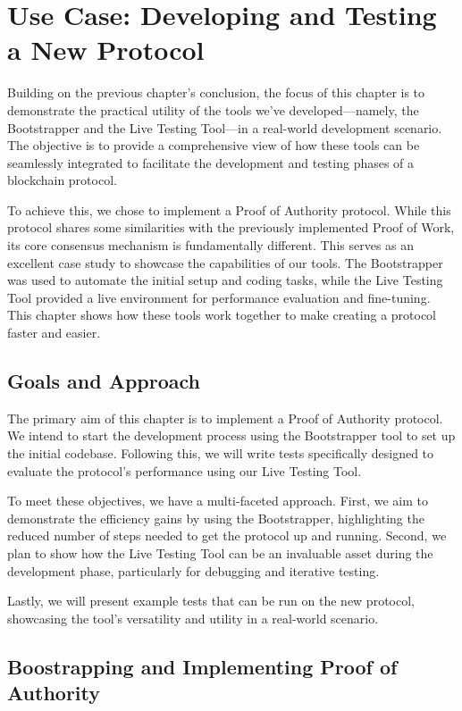 \chapter{Use Case: Developing and Testing a New Protocol}

Building on the previous chapter's conclusion, the focus of this chapter is to demonstrate the practical utility of the tools we've developed—namely, the Bootstrapper and the Live Testing Tool—in a real-world development scenario. The objective is to provide a comprehensive view of how these tools can be seamlessly integrated to facilitate the development and testing phases of a blockchain protocol.

To achieve this, we chose to implement a Proof of Authority protocol. While this protocol shares some similarities with the previously implemented Proof of Work, its core consensus mechanism is fundamentally different. This serves as an excellent case study to showcase the capabilities of our tools. The Bootstrapper was used to automate the initial setup and coding tasks, while the Live Testing Tool provided a live environment for performance evaluation and fine-tuning. This chapter shows how these tools work together to make creating a protocol faster and easier.



\section{Goals and Approach}
The primary aim of this chapter is to implement a Proof of Authority protocol. We intend to start the development process using the Bootstrapper tool to set up the initial codebase. Following this, we will write tests specifically designed to evaluate the protocol's performance using our Live Testing Tool.

To meet these objectives, we have a multi-faceted approach. First, we aim to demonstrate the efficiency gains by using the Bootstrapper, highlighting the reduced number of steps needed to get the protocol up and running. Second, we plan to show how the Live Testing Tool can be an invaluable asset during the development phase, particularly for debugging and iterative testing.

Lastly, we will present example tests that can be run on the new protocol, showcasing the tool's versatility and utility in a real-world scenario.

\section{Boostrapping and Implementing Proof of Authority}

